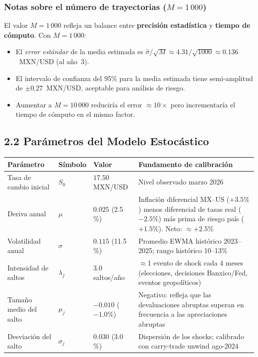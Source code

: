 \documentclass[11pt,letterpaper]{article}
\begin{document}
\subsubsection*{Notas sobre el número de trayectorias ($M = 1\,000$)}

El valor $M = 1\,000$ refleja un balance entre \textbf{precisión estadística}
y \textbf{tiempo de cómputo}.  Con $M = 1\,000$:

\begin{itemize}
    \item El \textit{error estándar} de la media estimada es
          $\hat{\sigma}/\sqrt{M} \approx 4.31/\sqrt{1000} \approx 0.136$~MXN/USD
          (al año~3).
    \item El intervalo de confianza del 95\% para la media estimada tiene
          semi-amplitud de $\pm 0.27$~MXN/USD, aceptable para análisis de riesgo.
    \item Aumentar a $M = 10\,000$ reduciría el error $\approx 10\times$
          pero incrementaría el tiempo de cómputo en el mismo factor.
\end{itemize}

\subsection*{2.2 Parámetros del Modelo Estocástico}

\begin{center}
\begin{tabular}{@{}lllp{6.8cm}@{}}
\toprule
\textbf{Parámetro} & \textbf{Símbolo} & \textbf{Valor} & \textbf{Fundamento de calibración} \\
\midrule
Tasa de cambio inicial & $S_0$ & $17.50$ MXN/USD
    & Nivel observado marzo 2026 \\[4pt]
Deriva anual & $\mu$ & $0.025$ (2.5\,\%)
    & Inflación diferencial MX--US ($+3.5\%$) menos diferencial de tasas real
      ($-2.5\%$) más prima de riesgo país ($+1.5\%$). Neto: $\approx +2.5\%$ \\[4pt]
Volatilidad anual & $\sigma$ & $0.115$ (11.5\,\%)
    & Promedio EWMA histórico 2023--2025; rango histórico 10--13\% \\[4pt]
Intensidad de saltos & $\lambda_j$ & $3.0$ saltos/año
    & $\approx$1 evento de shock cada 4 meses (elecciones, decisiones Banxico/Fed,
      eventos geopolíticos) \\[4pt]
Tamaño medio del salto & $\mu_j$ & $-0.010$ ($-1.0\%$)
    & Negativo: refleja que las devaluaciones abruptas superan en frecuencia
      a las apreciaciones abruptas \\[4pt]
Desviación del salto & $\sigma_j$ & $0.030$ (3.0\,\%)
    & Dispersión de los shocks; calibrado con carry-trade unwind ago-2024 \\[4pt]
\bottomrule
\end{tabular}
\end{center}
\end{document}
